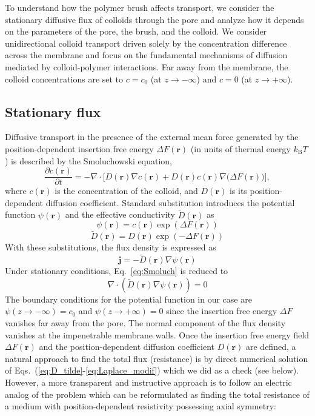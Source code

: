 \documentclass[12pt, a4paper]{article}
\begin{document}
To understand how the polymer brush affects transport, we consider the stationary diffusive flux of colloids through the pore and analyze how it depends on the parameters of the pore, the brush, and the colloid.
We consider unidirectional colloid transport driven solely by the concentration difference across the membrane and focus on the fundamental mechanisms of diffusion mediated by colloid-polymer interactions.
Far away from the membrane, the colloid concentrations are set to $c = c_0$ (at $z \to -\infty$) and $c = 0$ (at $z \to +\infty$).


\subsection{Stationary flux}

Diffusive transport in the presence of the external mean force generated by the position-dependent insertion free energy $\Delta F(\bm{r})$ (in units of thermal energy $k_{\text{B}}T$) is described by the Smoluchowski equation,
\begin{equation}
    \frac{\partial c(\bm{r})}{\partial t}=-\nabla \cdot \bigl[D(\bm{r}) \nabla c({\bm{r}})+D(\bm{r})c({\bm{r}})\nabla\bigl(\Delta F(\bm{r})\bigr)\bigr],
    \label{eq:Smoluch}
\end{equation}
where $c(\bm{r})$ is the concentration of the colloid, and $D(\bm{r})$ is its position-dependent diffusion coefficient.
Standard substitution introduces the potential function $\psi(\bm{r})$ and the effective conductivity $\tilde{D}(\bm{r})$ as
\begin{equation}
     \psi(\bm{r})=c(\bm{r})\exp(\Delta F(\bm{r}))
     \label{eq:psi} 
\end{equation}
\begin{equation}
    \tilde{D}(\bm{r})=D(\bm{r}) \exp(-\Delta F(\bm{r})) 
    \label{eq:D_tilde}
\end{equation}
With these substitutions, the flux density is expressed as
\begin{equation}
    \bm{j}=- \tilde{D}(\bm{r})  \nabla \psi(\bm{r})
    \label{eq:flux_psi}
\end{equation}
Under stationary conditions, Eq.~\eqref{eq:Smoluch} is reduced to
\begin{equation}
    \nabla \cdot \left(\tilde{D}(\bm{r})\nabla\psi(\bm{r}) \right)=0
    \label{eq:Laplace_modif}
\end{equation}
The boundary conditions for the potential function in our case are $\psi(z\rightarrow -\infty)=c_0$ and $\psi(z\rightarrow +\infty)=0$ since the insertion free energy $\Delta F$ vanishes far away from the pore.
The normal component of the flux density vanishes at the impenetrable membrane walls.
Once the insertion free energy field $\Delta F(\bm{r})$ and the position-dependent diffusion coefficient $D(\bm{r})$  are defined, a natural approach to find the total flux (resistance) is by direct numerical solution of Eqs.~(\ref{eq:D_tilde}-\ref{eq:Laplace_modif}) which we did as a check (see below).
However, a more transparent and instructive approach is to follow an electric analog of the problem which can be reformulated as finding the total resistance of a medium with position-dependent resistivity possessing axial symmetry:
\end{document}
